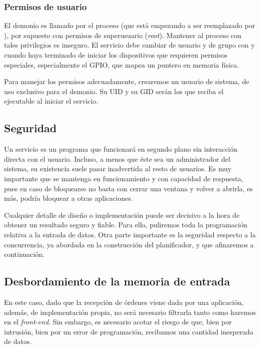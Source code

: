 \subsubsection{Permisos de usuario}

El demonio es llamado por el proceso  (que está empezando a ser reemplazado por ), por supuesto con permisos de superusuario (\textit{root}). Mantener al proceso con tales privilegios es inseguro. El servicio debe cambiar de usuario y de grupo con  y  cuando haya terminado de iniciar los dispositivos que requieren permisos especiales, especialmente el \acrshort{GPIO}, que mapea un puntero en memoria física.

Para manejar los permisos adecuadamente, crearemos un usuario de sistema, de uso exclusivo para el demonio. Su \acrshort{UID} y su \acrshort{GID} serán los que reciba el ejecutable al iniciar el servicio.

\subsection{Seguridad}
\label{subsec:seg_demonio}

Un servicio es un programa que funcionará en segundo plano sin interacción directa con el usuario. Incluso, a menos que éste sea un administrador del sistema, su existencia suele pasar inadvertida al resto de usuarios. Es muy importante que se mantenga en funcionamiento y con capacidad de respuesta, pues en caso de bloquearse no basta con cerrar una ventana y volver a abrirla, es más, podría bloquear a otras aplicaciones.

Cualquier detalle de diseño o implementación puede ser decisivo a la hora de obtener un resultado seguro y fiable. Para ello, puliremos toda la programación relativa a la entrada de datos. Otra parte importante es la seguridad respecto a la concurrencia, ya abordada en la construcción del planificador, y que afinaremos a continuación.

\subsection{Desbordamiento de la memoria de entrada}

En este caso, dado que la recepción de órdenes viene dada por una aplicación, además, de implementación propia, no será necesario filtrarla tanto como haremos en el \textit{front-end}. Sin embargo, es necesario acotar el riesgo de que, bien por intrusión, bien por un error de programación, recibamos una cantidad inesperada de datos.

